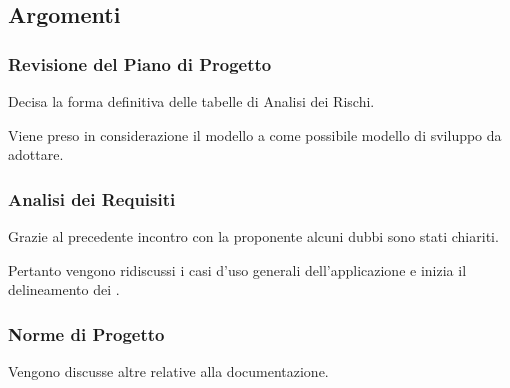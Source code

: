         \subsection{Argomenti}
            \subsubsection{Revisione del Piano di Progetto}
            Decisa la forma definitiva delle tabelle di Analisi dei Rischi.\par
            Viene preso in considerazione il modello a  come possibile modello di sviluppo da adottare.\par
            
            \subsubsection{Analisi dei Requisiti}
            Grazie al precedente incontro con la proponente {\II} alcuni dubbi sono stati chiariti.\par
            Pertanto vengono ridiscussi i casi d'uso generali dell'applicazione e inizia il delineamento dei .
            
            \subsubsection{Norme di Progetto}
            Vengono discusse altre \NdP relative alla documentazione.

